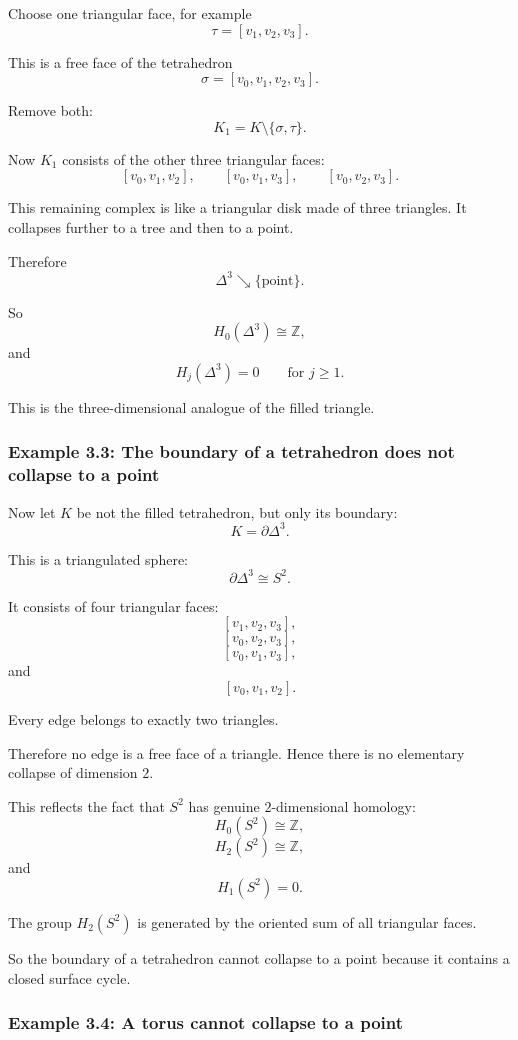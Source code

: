 \documentclass[12pt,a4paper]{article}
\theoremstyle{notespace}
\begin{document}
Choose one triangular face, for example
\[
\tau=[v_1,v_2,v_3].
\]

This is a free face of the tetrahedron
\[
\sigma=[v_0,v_1,v_2,v_3].
\]

Remove both:
\[
K_1=K\setminus\{\sigma,\tau\}.
\]

Now \(K_1\) consists of the other three triangular faces:
\[
[v_0,v_1,v_2],
\qquad
[v_0,v_1,v_3],
\qquad
[v_0,v_2,v_3].
\]

This remaining complex is like a triangular disk made of three triangles. It collapses further to a tree and then to a point.

Therefore
\[
\Delta^3\searrow \{\text{point}\}.
\]

So
\[
H_0(\Delta^3)\cong \mathbb Z,
\]
and
\[
H_j(\Delta^3)=0
\qquad
\text{for }j\geq 1.
\]

This is the three-dimensional analogue of the filled triangle.

\subsubsection{Example 3.3: The boundary of a tetrahedron does not collapse to a point}

Now let \(K\) be not the filled tetrahedron, but only its boundary:
\[
K=\partial \Delta^3.
\]

This is a triangulated sphere:
\[
\partial \Delta^3\cong S^2.
\]

It consists of four triangular faces:
\[
[v_1,v_2,v_3],
\]
\[
[v_0,v_2,v_3],
\]
\[
[v_0,v_1,v_3],
\]
and
\[
[v_0,v_1,v_2].
\]

Every edge belongs to exactly two triangles.

Therefore no edge is a free face of a triangle. Hence there is no elementary collapse of dimension \(2\).

This reflects the fact that \(S^2\) has genuine \(2\)-dimensional homology:
\[
H_0(S^2)\cong \mathbb Z,
\]
\[
H_2(S^2)\cong \mathbb Z,
\]
and
\[
H_1(S^2)=0.
\]

The group \(H_2(S^2)\) is generated by the oriented sum of all triangular faces.

So the boundary of a tetrahedron cannot collapse to a point because it contains a closed surface cycle.

\subsubsection{Example 3.4: A torus cannot collapse to a point}
\end{document}
